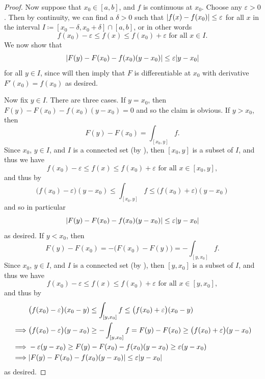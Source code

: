 \begin{proof}
  Now suppose that \(x_0 \in [a, b]\), and \(f\) is continuous at \(x_0\).
  Choose any \(\varepsilon > 0\).
  Then by continuity, we can find a \(\delta > 0\) such that \(\left\lvert f(x) - f(x_0)\right\rvert \leq \varepsilon\) for all \(x\) in the interval \(I \coloneqq [x_0 - \delta, x_0 + \delta] \cap [a, b]\), or in other words
  \[
    f(x_0) - \varepsilon \leq f(x) \leq f(x_0) + \varepsilon \text{ for all } x \in I.
  \]
  We now show that
  \[
    \abs{F(y) - F(x_0) - f(x_0)(y - x_0)} \leq \varepsilon \abs{y - x_0}
  \]
  for all \(y \in I\), since  will then imply that \(F\) is differentiable at \(x_0\) with derivative \(F'(x_0) = f(x_0)\) as desired.

  Now fix \(y \in I\).
  There are three cases.
  If \(y = x_0\), then \(F(y) - F(x_0) - f(x_0)(y - x_0) = 0\) and so the claim is obvious.
  If \(y > x_0\), then
  \[
    F(y) - F(x_0) = \int_{[x_0, y]} f.
  \]
  Since \(x_0\), \(y \in I\), and \(I\) is a connected set (by ), then \([x_0, y]\) is a subset of \(I\), and thus we have
  \[
    f(x_0) - \varepsilon \leq f(x) \leq f(x_0) + \varepsilon \text{ for all } x \in [x_0, y],
  \]
  and thus by 
  \[
    \big(f(x_0) - \varepsilon\big) (y - x_0) \leq \int_{[x_0, y]} f \leq \big(f(x_0) + \varepsilon\big) (y - x_0)
  \]
  and so in particular
  \[
    \abs{F(y) - F(x_0) - f(x_0)(y - x_0)} \leq \varepsilon \abs{y - x_0}
  \]
  as desired.
  If \(y < x_0\), then
  \[
    F(y) - F(x_0) = -\big(F(x_0) - F(y)\big) = -\int_{[y, x_0]} f.
  \]
  Since \(x_0\), \(y \in I\), and \(I\) is a connected set (by ), then \([y, x_0]\) is a subset of \(I\), and thus we have
  \[
    f(x_0) - \varepsilon \leq f(x) \leq f(x_0) + \varepsilon \text{ for all } x \in [y, x_0],
  \]
  and thus by 
  \begin{align*}
             & \big(f(x_0) - \varepsilon\big) (x_0 - y) \leq \int_{[y, x_0]} f \leq \big(f(x_0) + \varepsilon\big) (x_0 - y)                  \\
    \implies & \big(f(x_0) - \varepsilon\big) (y - x_0) \geq -\int_{[y, x_0]} f = F(y) - F(x_0) \geq \big(f(x_0) + \varepsilon\big) (y - x_0) \\
    \implies & -\varepsilon (y - x_0) \geq F(y) - F(x_0) - f(x_0)(y - x_0) \geq \varepsilon (y - x_0)                                         \\
    \implies & \abs{F(y) - F(x_0) - f(x_0)(y - x_0)} \leq \varepsilon \abs{y - x_0}
  \end{align*}
  as desired.
\end{proof}

